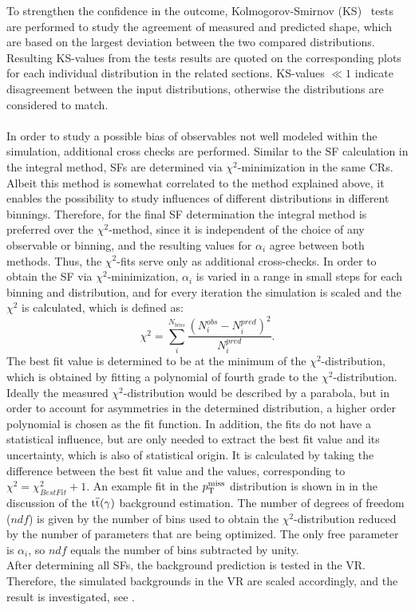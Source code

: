 To strengthen the confidence in the outcome, Kolmogorov-Smirnov (KS)~\cite{KS} tests are performed to study the agreement of measured and predicted shape, which are based on the largest deviation between the two compared distributions. Resulting KS-values from the tests results are quoted on the corresponding plots for each individual distribution in the related sections. KS-values $\ll1$ indicate disagreement between the input distributions, otherwise the distributions are considered to match.\\\\
In order to study a possible bias of observables not well modeled within the simulation, additional cross checks are performed. Similar to the SF calculation in the integral method, SFs are determined via $\chi^2$-minimization in the same CRs. Albeit this method is somewhat correlated to the method explained above, it enables the possibility to study influences of different distributions in different binnings. Therefore, for the final SF determination the integral method is preferred over the $\chi^2$-method, since it is independent of the choice of any observable or binning, and the resulting values for $\alpha_i$ agree between both methods. Thus, the $\chi^2$-fits serve only as additional cross-checks. In order to obtain the SF via $\chi^2$-minimization, $\alpha_{i}$ is varied in a range in small steps for each binning and distribution, and for every iteration the simulation is scaled and the $\chi^2$ is calculated, which is defined as:
\begin{equation}
 \chi^2=\sum_i^{N_{bins}} \frac{\left(N_{i}^{obs}-N_{i}^{pred}\right)^2}{N_{i}^{pred}}.
\end{equation}
The best fit value is determined to be at the minimum of the $\chi^2$-distribution, which is obtained by fitting a polynomial of fourth grade to the $\chi^2$-distribution. Ideally the measured $\chi^2$-distribution would be described by a parabola, but in order to account for asymmetries in the determined distribution, a higher order polynomial is chosen as the fit function. In addition, the fits do not have a statistical influence, but are only needed to extract the best fit value and its uncertainty, which is also of statistical origin. It is calculated by taking the difference between the best fit value and the values, corresponding to $\chi^2=\chi^2_{BestFit}+1$. An example fit in the $p_{\mathrm{T}}^\text{miss}$ distribution is shown in  in the discussion of the ${\mathrm{t}\overline{\mathrm{t}}}(\gamma)$ background estimation. The number of degrees of freedom ($ndf$) is given by the number of bins used to obtain the $\chi^2$-distribution reduced by the number of parameters that are being optimized. The only free parameter is $\alpha_{i}$, so $ndf$ equals the number of bins subtracted by unity.\\
After determining all SFs, the background prediction is tested in the VR. Therefore, the simulated backgrounds in the VR are scaled accordingly, and the result is investigated, see .



